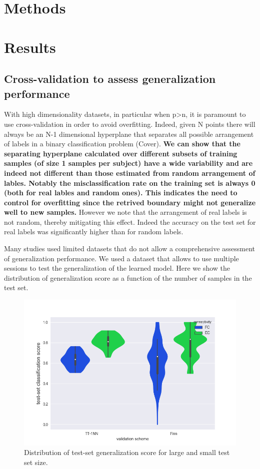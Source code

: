 \documentclass[12pt, a4paper, final, fleqn]{article}
\newcommand{\chngA}[1]{\textcolor{andrea}{\textsf{\textbf{#1}}}}
\begin{document}
\section{Methods}
\label{methods}

\section{Results}
\label{results}

\subsection{Cross-validation to assess generalization performance}
With high dimensionality datasets, in particular when p>n, it is paramount to use cross-validation in order to avoid overfitting.
Indeed, given N points there will always be an N-1 dimensional hyperplane that separates all possible arrangement of labels in a
binary classification problem (Cover).
\chngA{We can show that the separating hyperplane calculated over different subsets of training samples (of size 1 samples per subject) have a wide
variability and are indeed not different than those estimated from random arrangement of lables. Notably the misclassification rate on the
training set is always 0 (both for real lables and random ones). This indicates the need to control for overfitting since the retrived 
boundary might not generalize well to new samples.}
However we note that the arrangement of real labels is not random, thereby mitigating this effect. Indeed the accuracy on the test set for real
labels was significantly higher than for random labels.

Many studies used limited datasets that do not allow a comprehensive assessment of generalization performance.
We used a dataset that allows to use multiple sessions to test the generalization of the learned model.
Here we show the distribution of generalization score as a function of the number of samples in the test set.
\begin{figure}[!htb]
\begin{center}
\includegraphics[width=0.89\columnwidth]{variability_finn_1nn_violins_hues}
  \caption[Variability of generalization score]{Distribution of test-set generalization score for large and small test set size.
	  \label{fig:variability_score}}
\end{center}
\end{figure}
\end{document}
